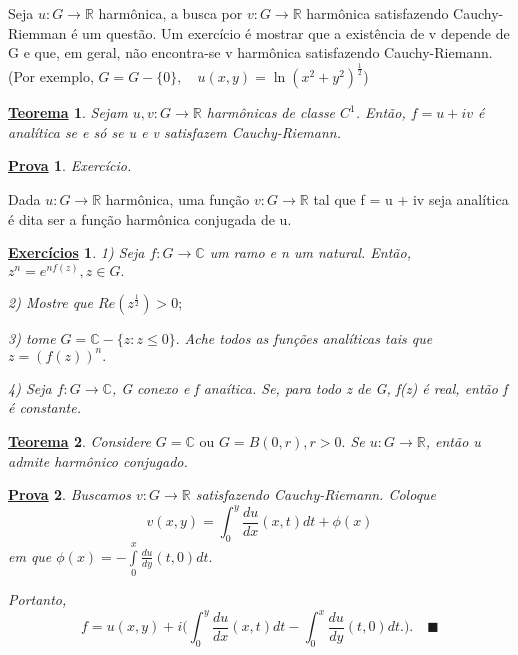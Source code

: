 \documentclass{article}
\newtheorem*{theorem*}{\underline{Teorema}}
\newtheorem*{proof*}{\underline{Prova}}
\newtheorem*{exer*}{\underline{Exerc\'icios}}
\renewcommand\qedsymbol{$\blacksquare$}
\begin{document}
  Seja $u:G\rightarrow \mathbb{R}$ harm\^onica, a busca por $v:G\rightarrow \mathbb{R}$ harm\^onica 
satisfazendo Cauchy-Riemman \'e um quest\~ao. Um exerc\'icio \'e mostrar que a exist\^encia de v
depende de G e que, em geral, n\~ao encontra-se v harm\^onica satisfazendo Cauchy-Riemann. 
(Por exemplo, $G = G - \{0\}, \quad u(x, y) = \ln{(x ^{2} + y ^{2})}^{\frac{1}{2}}$)
 \begin{theorem*}
   Sejam $u, v:G\rightarrow \mathbb{R}$ harm\^onicas de classe $C^1$. Ent\~ao, $f = u + iv$
\'e anal\'itica se e s\'o se u e v satisfazem Cauchy-Riemann.
 \end{theorem*}
\begin{proof*}
  Exerc\'icio.
\end{proof*}
  Dada $u:G\rightarrow \mathbb{R}$ harm\^onica, uma fun\c c\~ao $v:G\rightarrow \mathbb{R}$
tal que f = u + iv seja anal\'itica \'e dita ser a fun\c c\~ao harm\^onica conjugada de u.
\begin{exer*}
\item[1)] Seja $f:G\rightarrow \mathbb{C}$  um ramo e n um natural. Ent\~ao, $z ^{n} = e ^{nf(z)}, z\in{G}.$
  \item[2)] Mostre que $Re(z ^{\frac{1}{2}}) > 0;$
  \item[3)] tome $G = \mathbb{C} - \{z: z\leq{0}\}.$ Ache todos as fun\c c\~oes anal\'iticas
tais que $z = (f(z))^{n}.$
  \item[4)] Seja $f:G\rightarrow \mathbb{C}$, G conexo e f ana\'itica. Se, para todo
z de G, f(z) \'e real, ent\~ao f \'e constante.
\end{exer*}
\begin{theorem*}
  Considere $G = \mathbb{C} \text{ ou } G = B(0, r), r > 0.$ Se $u:G\rightarrow \mathbb{R}$, 
ent\~ao u admite harm\^onico conjugado.
\end{theorem*}
\begin{proof*}
  Buscamos $v:G\rightarrow \mathbb{R}$ satisfazendo Cauchy-Riemann. Coloque 
  $$
    v(x, y) = \int_{0}^{y}\frac{du}{dx}(x, t)dt + \phi(x)
  $$
em que $\phi(x) = -\int\limits_{0}^{x}\frac{du}{dy}(t, 0)dt.$

  Portanto, 
  $$
  f = u(x, y) + i\biggl(\int_{0}^{y}\frac{du}{dx}(x, t)dt - \int_{0}^{x}\frac{du}{dy}(t, 0)dt.\biggr).\quad\text{\qedsymbol}
  $$
\end{proof*}
\end{document}
